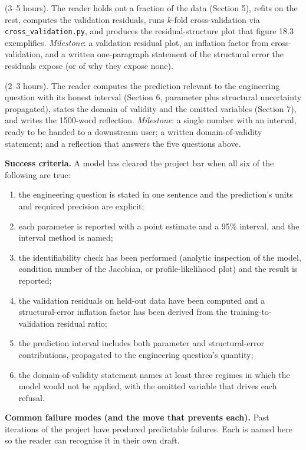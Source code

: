 \begin{project}
 (3--5 hours).
The reader holds out a fraction of the data (Section 5), refits on
the rest, computes the validation residuals, runs $k$-fold
cross-validation via \texttt{cross\_validation.py}, and produces
the residual-structure plot that figure 18.3 exemplifies.
\textit{Milestone}: a validation residual plot, an inflation factor
from cross-validation, and a written one-paragraph statement of
the structural error the residuals expose (or of why they expose
none).

 (2--3 hours). The reader
computes the prediction relevant to the engineering question with
its honest interval (Section 6, parameter plus structural
uncertainty propagated), states the domain of validity and the
omitted variables (Section 7), and writes the 1500-word reflection.
\textit{Milestone}: a single number with an interval, ready to be
handed to a downstream user; a written domain-of-validity statement;
and a reflection that answers the five questions above.

\smallskip
\textbf{Success criteria.} A model has cleared the project bar when
all six of the following are true:

\begin{enumerate}
\item the engineering question is stated in one sentence and the
prediction's units and required precision are explicit;
\item each parameter is reported with a point estimate and a 95\%
interval, and the interval method is named;
\item the identifiability check has been performed (analytic
inspection of the model, condition number of the Jacobian, or
profile-likelihood plot) and the result is reported;
\item the validation residuals on held-out data have been computed
and a structural-error inflation factor has been derived from the
training-to-validation residual ratio;
\item the prediction interval includes both parameter and
structural-error contributions, propagated to the engineering
question's quantity;
\item the domain-of-validity statement names at least three
regimes in which the model would not be applied, with the omitted
variable that drives each refusal.
\end{enumerate}

\smallskip
\textbf{Common failure modes (and the move that prevents each).}
Past iterations of the project have produced predictable failures.
Each is named here so the reader can recognise it in their own
draft.


\end{project}
